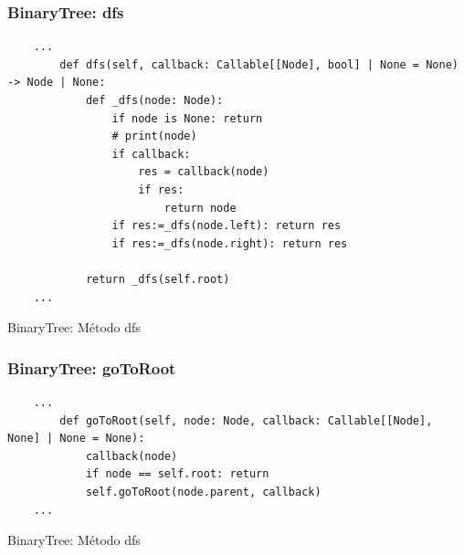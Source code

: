 \subsubsection{BinaryTree: dfs}

\begin{listing}[H]
    \begin{verbatim}
    ...
        def dfs(self, callback: Callable[[Node], bool] | None = None) -> Node | None:
            def _dfs(node: Node):
                if node is None: return
                # print(node)
                if callback:
                    res = callback(node)
                    if res:
                        return node
                if res:=_dfs(node.left): return res
                if res:=_dfs(node.right): return res

            return _dfs(self.root)
    ...
    \end{verbatim}
    \caption{BinaryTree: Método dfs}
    \label{listing:btree-dfs}
\end{listing}

\subsubsection{BinaryTree: goToRoot}

\begin{listing}[H]
    \begin{verbatim}
    ...
        def goToRoot(self, node: Node, callback: Callable[[Node], None] | None = None):
            callback(node)
            if node == self.root: return
            self.goToRoot(node.parent, callback)
    ...
    \end{verbatim}
    \caption{BinaryTree: Método dfs}
    \label{listing:btree-dfs}
\end{listing}

